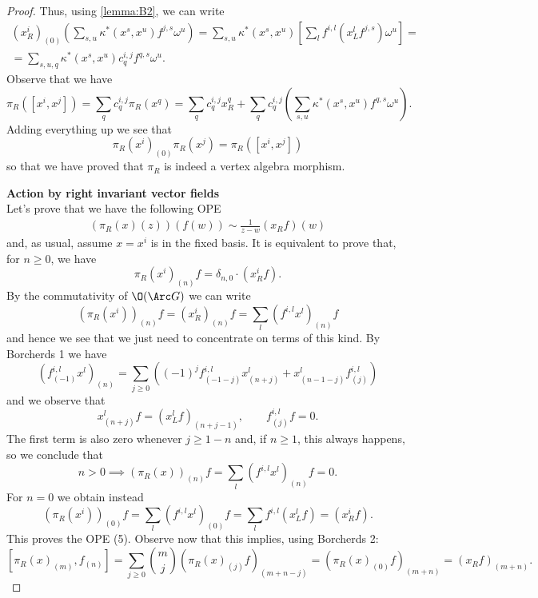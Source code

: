 \documentclass[a4paper, 10pt]{article}
\begin{document}
\begin{proof}
                Thus, using \cref{lemma:B2}, we can write 
                \begin{gather*}
                    (x^i_R)_{(0)}\left(\sum_{s,u} \kappa^*(x^s, x^u)f^{j,s}\omega^u \right) = \sum_{s, u} \kappa^*(x^s, x^u) \left[\sum_l f^{i,l}(x^l_Lf^{j,s})\omega^u \right] = \\
                    = \sum_{s, u, q} \kappa^*(x^s, x^u)c^{i,j}_qf^{q,s}\omega^u.
                \end{gather*} 
                Observe that we have \[\pi_R([x^i, x^j]) = \sum_q c^{i,j}_q\pi_R(x^q) = \sum_q c^{i,j}_qx^q_R + \sum_q c^{i,j}_q\left(\sum_ {s, u}\kappa^*(x^s, x^u)f^{q,s}\omega^u\right). \] Adding everything up we see that \[\pi_R(x^i)_{(0)}\pi_R(x^j) = \pi_R([x^i, x^j]) \] so that we have proved that $\pi_R$ is indeed a vertex algebra morphism.

                \textbf{Action by right invariant vector fields}\\
                Let's prove that we have the following OPE 
                \begin{gather}
                    (\pi_R(x)(z))(f(w)) \sim \frac{1}{z-w}(x_Rf)(w)
                \end{gather}
                and, as usual, assume $x = x^i$ is in the fixed basis. It is equivalent to prove that, for $n \geq 0$, we have \[\pi_R(x^i)_{(n)}f = \delta_{n, 0} \cdot (x^i_Rf).\] By the commutativity of $\O(\Arc G)$ we can write \[ (\pi_R(x^i))_{(n)}f = (x^i_R)_{(n)}f = \sum_l (f^{i,l}x^l)_{(n)}f  \] and hence we see that we just need to concentrate on terms of this kind.
                By Borcherds 1 we have \[(f^{i,l}_{(-1)}x^l)_{(n)} = \sum_{j \geq 0}\left((-1)^jf^{i,l}_{(-1-j)}x^l_{(n+j)} + x^l_{(n-1-j)}f^{i,l}_{(j)} \right) \] and we observe that \[x^l_{(n+j)}f = (x^l_Lf)_{(n+j-1)}, \qquad f^{i,l}_{(j)}f = 0. \] The first term is also zero whenever $j \geq 1 - n$ and, if $n \geq 1$, this always happens, so we conclude that \[n > 0 \implies (\pi_R(x))_{(n)}f = \sum_l (f^{i,l}x^l)_{(n)}f = 0. \] For $n = 0$ we obtain instead \[(\pi_R(x^i))_{(0)}f = \sum_l (f^{i,l}x^l)_{(0)}f = \sum_l f^{i,l}(x^l_Lf) = (x^i_Rf). \]
                This proves the OPE (5). Observe now that this implies, using Borcherds 2: \[[\pi_R(x)_{(m)}, f_{(n)}] = \sum_{j \geq 0} \binom{m}{j} (\pi_R(x)_{(j)}f)_{(m+n-j)} = (\pi_R(x)_{(0)}f)_{(m+n)} = (x_Rf)_{(m+n)}. \]



\end{proof}
\end{document}
